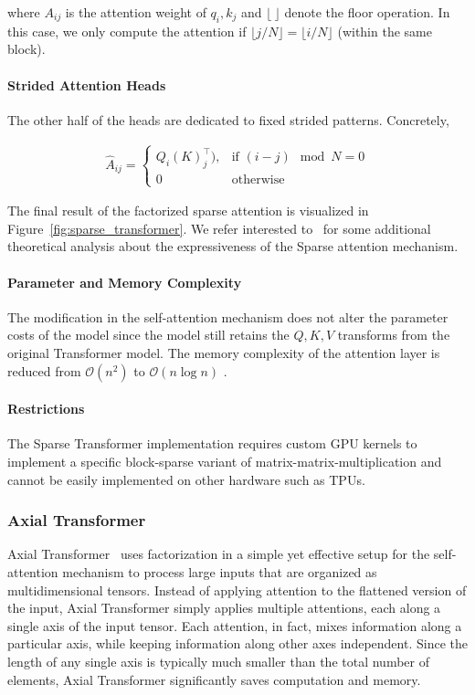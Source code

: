 where $A_{ij}$ is the attention weight of $q_i,k_j$ and $\lfloor \: \rfloor$ denote the floor operation. In this case, we only compute the attention if $\lfloor{{j}/{N}}\rfloor = \lfloor{i/{N}}\rfloor$ (within the same block). 
\paragraph{Strided Attention Heads} The other half of the heads are dedicated to fixed strided patterns. Concretely,

\begin{align*}
    \hat{A}_{ij} = 
    \begin{cases}
    Q_{i}(K)_{j}^\top),& \text{if } (i-j) \mod N =0 \\
    0              & \text{otherwise}
\end{cases}
\end{align*}

The final result of the factorized sparse attention is visualized in Figure~\ref{fig:sparse_transformer}. We refer interested to~\citep{yun2020n} for some additional theoretical analysis about the expressiveness of the Sparse attention mechanism.
\paragraph{Parameter and Memory Complexity} The modification in the self-attention mechanism does not alter the parameter costs of the model since the model still retains the $Q,K,V$ transforms from the original Transformer model. The memory complexity of the attention layer is reduced from $\mathcal{O}(n^2)$ to $\mathcal{O}(n\log n)$ . 

\paragraph{Restrictions} The Sparse Transformer implementation requires custom GPU kernels to implement a specific block-sparse variant of matrix-matrix-multiplication and cannot be easily implemented on other hardware such as TPUs.

\subsubsection{Axial Transformer}

Axial Transformer~\citep{ho2019axial, weissenborn2019scaling} uses factorization in a simple yet effective setup for the self-attention mechanism to process large inputs that are organized as multidimensional tensors. Instead of applying attention to the flattened version of the input, Axial Transformer simply applies multiple attentions, each along a single axis of the input tensor. Each attention, in fact, mixes information along a particular axis, while keeping information along other axes independent.  Since the length of any single axis is typically much smaller than the total number of elements, Axial Transformer significantly saves computation and memory. 

